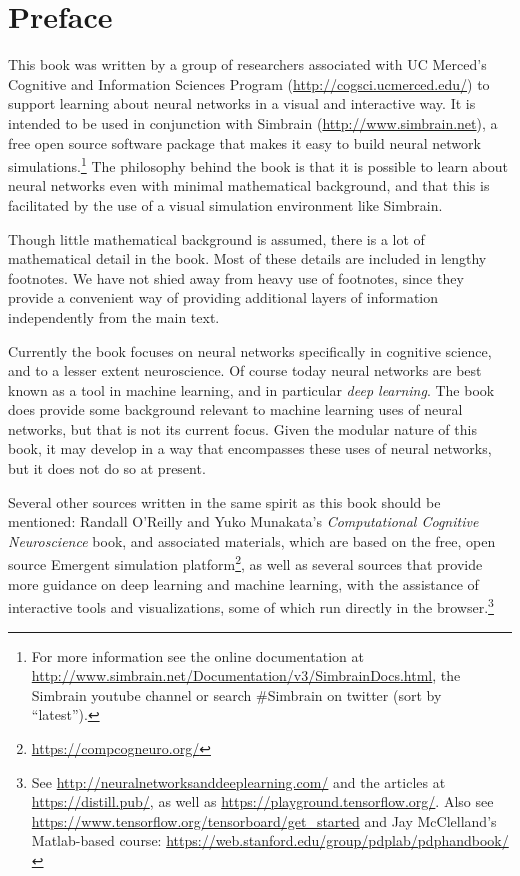\chapter*{Preface}\label{ch_preface}

This book was written by a group of researchers associated with UC Merced's Cognitive and Information Sciences Program (\url{http://cogsci.ucmerced.edu/}) to support learning about neural networks in a visual and interactive way. It is intended to be used in conjunction with Simbrain (\url{http://www.simbrain.net}), a free open source software package that makes it easy to build neural network simulations.\footnote{For more information see the online documentation at \url{http://www.simbrain.net/Documentation/v3/SimbrainDocs.html}, the Simbrain youtube channel or search \#Simbrain on twitter (sort by ``latest'').} The philosophy behind the book is that it is possible to learn about neural networks even with minimal mathematical background, and that this is facilitated by the use of a visual simulation environment like Simbrain.

Though little mathematical background is assumed, there is a lot of mathematical detail in the book. Most of these details are included in lengthy footnotes. We have not shied away from heavy use of footnotes, since they provide a convenient way of providing additional layers of information independently from the main text. 

Currently the book focuses on neural networks specifically in cognitive science, and to a lesser extent neuroscience. Of course today neural networks are best known as a tool in machine learning, and in particular \emph{deep learning}. The book does provide some background relevant to machine learning uses of neural networks, but that is not its current focus. Given the modular nature of this book, it may develop in a way that encompasses these uses of neural networks, but it does not do so at present.

Several other sources written in the same spirit as this book should be mentioned: Randall O'Reilly and Yuko Munakata's \emph{Computational Cognitive Neuroscience} book, and associated materials, which are based on the free, open source Emergent simulation platform\footnote{\url{https://compcogneuro.org/}}, as well as several sources that provide more guidance on deep learning and machine learning, with the assistance of interactive tools and visualizations, some of which run directly in the browser.\footnote{See \url{http://neuralnetworksanddeeplearning.com/} and the articles at \url{https://distill.pub/}, as well as \url{https://playground.tensorflow.org/}. Also see  \url{https://www.tensorflow.org/tensorboard/get_started} and Jay McClelland's Matlab-based course: \url{https://web.stanford.edu/group/pdplab/pdphandbook/}}

